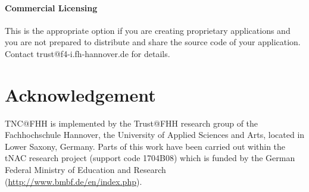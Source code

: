 \documentclass[a4paper,10pt]{scrartcl}
\begin{document}
\paragraph{Commercial Licensing} This is the appropriate option if you are
creating proprietary applications and you are not prepared to
distribute and share the source code of your application.
Contact trust@f4-i.fh-hannover.de for details.

\section{Acknowledgement}
TNC@FHH is implemented by the Trust@FHH research group of the Fachhochschule Hannover, the University of Applied Sciences and Arts, located in Lower Saxony, Germany. Parts of this work have been carried out within the tNAC research project (support code 1704B08) which is funded by the German Federal Ministry of Education and Research (\url{http://www.bmbf.de/en/index.php}).
\end{document}
